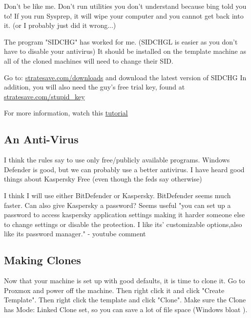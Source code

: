 \documentclass{article}
\begin{document}
Don’t be like me. Don’t run utilities you don’t understand because bing told you to!
If you run Sysprep, it will wipe your computer and you cannot get back into it. (or I probably just did it wrong...)

\noindent The program "SIDCHG" has worked for me. (SIDCHGL is easier as you don't have to disable your antivirus)
It should be installed on the template machine as all of the cloned machines will need to change their SID.

Go to: \href{https://www.stratesave.com/html/downloads.html}{stratesave.com/downloads}
and download the latest version of SIDCHG
In addition, you will also need the guy's free trial key, found at \href{https://www.stratesave.com/html/downloads.html}{stratesave.com/stupid\_key}

For more information, watch this \href{https://www.youtube.com/watch?v=4fImvgWayI0}{tutorial}

\subsection{An Anti-Virus}

I think the rules say to use only free/publicly available programs.
Windows Defender is good, but we can probably use a better antivirus.
I have heard good things about Kaspersky Free (even though the feds say otherwise)

I think I will use either BitDefender or Kaspersky. BitDefender seems much faster.
Can also give Kaspersky a password? Seems useful "you can set up a password to access kaspersky application settings making it harder someone else to change settings or disable the protection. I like its' customizable options,also like its password manager."
- youtube comment

\subsection{Making Clones}
Now that your machine is set up with good defaults, it is time to clone it. Go to Proxmox and power off the machine. Then right click it and click "Create Template".
Then right click the template and click "Clone". Make sure the Clone has Mode: Linked Clone set, so you can save a lot of file space (Windows bloat \Vomey{}).
\end{document}
